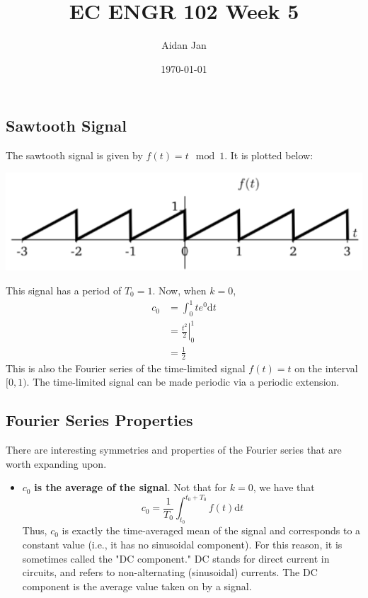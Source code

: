 \documentclass[10pt]{article}
\title{EC ENGR 102 Week 5}
\author{Aidan Jan}
\date{\today}
\begin{document}
\maketitle

\subsection*{Sawtooth Signal}
The sawtooth signal is given by $f(t) = t \mod 1$.  It is plotted below:
\begin{center}
    \includegraphics[scale=0.9]{W4_13.png}
\end{center}
This signal has a period of $T_0 = 1$.  Now, when $k = 0$,
\begin{align*}
    c_0 &= \int_0^1 te^0 \text{d}t\\
    &= \left.\frac{t^2}{2}\right|_0^1\\
    &= \frac{1}{2}
\end{align*}
This is also the Fourier series of the time-limited signal $f(t) = t$ on the interval $[0, 1)$.  The time-limited signal can be made periodic via a periodic extension.

\subsection*{Fourier Series Properties}
There are interesting symmetries and properties of the Fourier series that are worth expanding upon.
\begin{itemize}
    \item $c_0$ \textbf{is the average of the signal}.  Not that for $k = 0$, we have that
    \[c_0 = \frac{1}{T_0} \int_{t_0}^{t_0 + T_0} f(t) \text{d}t\]
    Thus, $c_0$ is exactly the time-averaged mean of the signal and corresponds to a constant value (i.e., it has no sinusoidal component).  For this reason, it is sometimes called the "DC component."  DC stands for direct current in circuits, and refers to non-alternating (sinusoidal) currents.  The DC component is the average value taken on by a signal.
\end{itemize}
\end{document}
